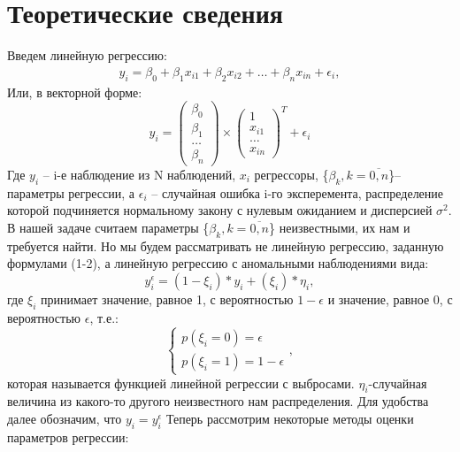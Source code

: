 \documentclass[12pt]{article}
\begin{document}
\section{Теоретические сведения}
Введем линейную регрессию:\hfill\break
\begin{eqnarray}
    y_i=\beta_0+\beta_1 x_{i1}+\beta_2 x_{i2}+\dots+\beta_n x_{in}+\epsilon_i,
\end{eqnarray}
Или, в векторной форме:
\begin{equation}
    y_i= 
    \begin{pmatrix}
        \beta_0\\
        \beta_1\\
        \dots\\
        \beta_n
    \end{pmatrix}\times
    \begin{pmatrix}
        1\\
        x_{i1}\\
        \dots\\
        x_{in}
    \end{pmatrix}^{T}+ \epsilon_i
\end{equation}
Где $y_i$ -- i-е наблюдение из N наблюдений, $x_i$ регрессоры, \{$\beta_k, k=\overline{0,n}$\}-- параметры регрессии, а $\epsilon_i$ -- случайная ошибка i-го эксперемента, распределение которой подчиняется нормальному закону с нулевым ожиданием и дисперсией $\sigma^2$.\hfill\break
В нашей задаче считаем параметры \{$\beta_k, k=\overline{0,n}$\} неизвестными, их нам и требуется найти.\hfill\break
Но мы будем рассматривать не линейную регрессию, заданную формулами (1-2), а линейную регрессию с аномальными наблюдениями вида:
\begin{equation}
    y_i^{\epsilon}=(1-\xi_i)*y_i+ (\xi_i)*\eta_i,
\end{equation}
где $\xi_i$ принимает значение, равное 1, с вероятностью $1-\epsilon$ и значение, равное 0, с вероятностью $\epsilon$, т.е.:
\begin{equation}
    \begin{cases}
        p(\xi_i=0)=\epsilon\\
        p(\xi_i=1)=1-\epsilon
    \end{cases},
\end{equation}
которая называется функцией линейной регрессии с выбросами. $\eta_i$-случайная величина из какого-то другого неизвестного нам распределения.\hfill\break
Для удобства далее обозначим, что $y_i=y_i^{\epsilon}$\hfill\break
Теперь рассмотрим некоторые методы оценки параметров регрессии:
\end{document}
